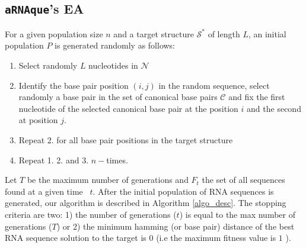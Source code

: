 \subsection{\texttt{aRNAque}'s EA}

For a given population size $n$ and a target structure $\mathcal{S}^*$ of length $L$, an initial population $P$ is generated randomly as follows: 

\begin{enumerate}
	\item Select randomly $L$ nucleotides in $\mathcal{N}$
	
	\item Identify the base pair position $(i,j)$ in the random sequence, select randomly a base pair in the set of canonical base pairs $\mathcal{C}$ and fix the first nucleotide of the selected canonical base pair at the position $i$ and the second at position $j$.
	
	\item  Repeat 2. for all base pair positions in the target structure
	
	\item Repeat 1. 2. and 3. $n-$times.
\end{enumerate}
Let \(T\) be the maximum number of generations and \(F_t\) the set of all sequences found at a given time ~\(t\). After the initial population of RNA sequences is generated, our algorithm is described in Algorithm \ref{algo_desc}. The stopping criteria are two: 1) the number of generations ($t$) is equal to the max number of generations ($T$) or 2) the minimum hamming (or base pair) distance of the best RNA sequence solution to the target is $0$ (i.e the maximum fitness value is $1$ ).
\vspace{0.05cm}
